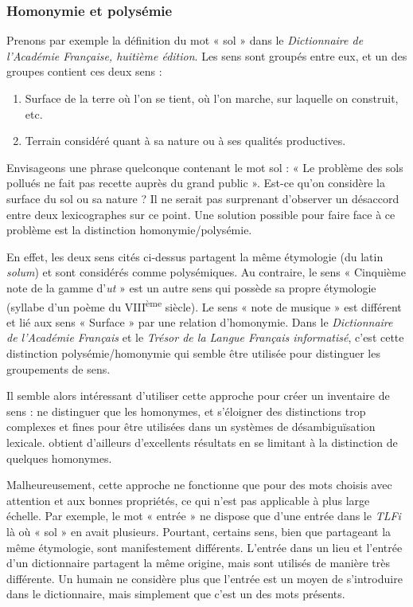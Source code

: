 \subsubsection{Homonymie et polysémie}

Prenons par exemple la définition du mot « sol » dans le \textit{Dictionnaire de l'Académie Française, huitième édition}. Les sens sont groupés entre eux, et un des groupes contient ces deux sens :
\begin{enumerate}
  \item Surface de la terre où l'on se tient, où l'on marche, sur laquelle on construit, etc.
  \item Terrain considéré quant à sa nature ou à ses qualités productives.
\end{enumerate}

Envisageons une phrase quelconque contenant le mot sol : « Le problème des sols pollués ne fait pas recette auprès du grand public ». Est-ce qu'on considère la surface du sol ou sa nature ? Il ne serait pas surprenant d'observer un désaccord entre deux lexicographes sur ce point. Une solution possible pour faire face à ce problème est la distinction homonymie/polysémie.

En effet, les deux sens cités ci-dessus partagent la même étymologie (du latin \textit{solum}) et sont considérés comme polysémiques. Au contraire, le sens « Cinquième note de la gamme d'\textit{ut} » est un autre sens qui possède sa propre étymologie (syllabe d'un poème du VIII\textsuperscript{ème} siècle). Le sens « note de musique » est différent et lié aux sens « Surface » par une relation d'homonymie. Dans le \textit{Dictionnaire de l'Académie Français} et le \textit{Trésor de la Langue Français informatisé}, c'est cette distinction polysémie/homonymie qui semble être utilisée pour distinguer les groupements de sens.

Il semble alors intéressant d'utiliser cette approche pour créer un inventaire de sens : ne distinguer que les homonymes, et s'éloigner des distinctions trop complexes et fines pour être utilisées dans un systèmes de désambiguïsation lexicale. \cite{yarowsky1995unsupervised} obtient d'ailleurs d'excellents résultats en se limitant à la distinction de quelques homonymes.

Malheureusement, cette approche ne fonctionne que pour des mots choisis avec attention et aux bonnes propriétés, ce qui n'est pas applicable à plus large échelle. Par exemple, le mot « entrée » ne dispose que d'une entrée dans le \textit{TLFi} là où « sol » en avait plusieurs. Pourtant, certains sens, bien que partageant la même étymologie, sont manifestement différents. L'entrée dans un lieu et l'entrée d'un dictionnaire partagent la même origine, mais sont utilisés de manière très différente. Un humain ne considère plus que l'entrée est un moyen de s'introduire dans le dictionnaire, mais simplement que c'est un des mots présents.

